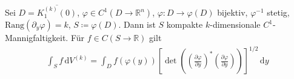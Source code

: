 
\begin{example} \label{thm:11.7}
  Sei $D = \overline{K_1^{(k)}(0)}$, $\varphi \in C^1(D \to \mathbb{R}^n)$, $\varphi : D \to \varphi(D)$ bijektiv, $\varphi^{-1}$ stetig, $\mathrm{Rang}(\partial_y \varphi) = k$, $S \coloneq \varphi(D)$. Dann ist $S$ kompakte $k$-dimensionale $C^1$-Mannigfaltigkeit. Für $f \in C(S \to \mathbb{R})$ gilt
  \begin{align*}
    \int_S f \, \mathrm{d}V^{(k)} = \int_D f(\varphi(y)) \left[ \det \left( \left( \frac{\partial \varphi}{\partial y} \right)^* \left( \frac{\partial \varphi}{\partial y} \right) \right) \right]^{1/2} \, \mathrm{d}y
  \end{align*}
\end{example}
